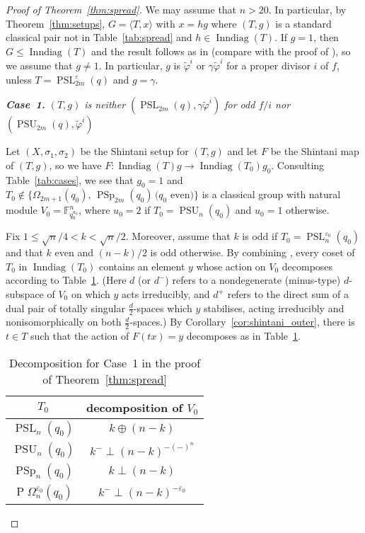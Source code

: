 \documentclass[11pt]{article}
\numberwithin{equation}{section}
\theoremstyle{shdefinition}
\theoremstyle{shplain}
\newcommand{\g}{\gamma}
\newcommand{\e}{\varepsilon}
\renewcommand{\wp}{\widetilde{\varphi}}
\newcommand{\s}{\sigma}
\newcommand{\<}{\langle}
\renewcommand{\>}{\rangle}
\renewcommand{\leq}{\leqslant}
\newcommand{\Inndiag}{\operatorname{Inndiag}}
\newcommand{\F}{\mathbb{F}}
\renewcommand{\:}{\colon}
\newcommand{\PSL}{\operatorname{PSL}}
\newcommand{\PSp}{\operatorname{PSp}}
\newcommand{\PSU}{\operatorname{PSU}}
\newcommand{\Om}{\Omega}
\newcommand{\POm}{\operatorname{P}\!\Om}
\begin{document}
\begin{proof}[Proof of Theorem~\ref{thm:spread}]
We may assume that $n > 20$. In particular, by Theorem~\ref{thm:setups}, $G = \<T,x\>$ with $x = hg$ where $(T,g)$ is a standard classical pair not in Table~\ref{tab:spread} and $h \in \Inndiag(T)$. If $g=1$, then $G \leq \Inndiag(T)$ and the result follows as in \cite[Proposition~4.1]{ref:GuralnickKantor00} (compare with the proof of \cite[Theorem~3.1]{ref:BurnessGuest13}), so we assume that $g \neq 1$. In particular, $g$ is $\wp^i$ or $\g\wp^i$ for a proper divisor $i$ of $f$, unless $T = \PSL^\e_{2m}(q)$ and $g=\g$. \vspace{0.5\baselineskip}

\emph{\textbf{Case~1.} $(T,g)$ is neither $(\PSL_{2m}(q),\g\wp^i)$ for odd $f/i$ nor $(\PSU_{2m}(q),\wp^i)$}\nopagebreak

Let $(X,\s_1,\s_2)$ be the Shintani setup for $(T,g)$ and let $F$ be the Shintani map of $(T,g)$, so we have $F\:\Inndiag(T)g \to \Inndiag(T_0)g_0$. Consulting Table~\ref{tab:cases}, we see that $g_0 = 1$ and $T_0 \not\in \{ \Omega_{2m+1}(q_0), \, \PSp_{2m}(q_0) \, \text{($q_0$ even)} \}$ is a classical group with natural module $V_0 = \F_{q_0^{u_0}}^n$, where $u_0=2$ if $T_0 = \PSU_n(q_0)$ and $u_0=1$ otherwise. 

Fix $1 \leq \sqrt{n}/4 < k < \sqrt{n}/2$. Moreover, assume that $k$ is odd if $T_0 = \PSL^{\e_0}_n(q_0)$ and that $k$ even and $(n-k)/2$ is odd otherwise. By combining \cite[Lemmas~5.3.2--5.36, 6.3.2 and~6.3.4]{ref:Harper}, every coset of $T_0$ in $\Inndiag(T_0)$ contains an element $y$ whose action on $V_0$ decomposes according to Table~\ref{tab:decomposition}. (Here $d$ (or $d^-$) refers to a nondegenerate (minus-type) $d$-subspace of $V_0$ on which $y$ acts irreducibly, and $d^+$ refers to the direct sum of a dual pair of totally singular $\frac{d}{2}$-spaces which $y$ stabilises, acting irreducibly and nonisomorphically on both $\frac{d}{2}$-spaces.) By Corollary~\ref{cor:shintani_outer}, there is $t \in T$ such that the action of $F(tx) = y$ decomposes as in Table~\ref{tab:decomposition}.

\begin{table}
\caption{Decomposition for Case~1 in the proof of Theorem~\ref{thm:spread}} \label{tab:decomposition}
\centering
\begin{tabular}{cc}
\hline
$T_0$                & decomposition of $V_0$      \\
\hline  
$\PSL_n(q_0)$        & $k   \oplus (n-k)$          \\  
$\PSU_n(q_0)$        & $k^- \perp (n-k)^{-(-)^n}$  \\
$\PSp_n(q_0)$        & $k   \perp (n-k)$           \\   
$\POm^{\e_0}_n(q_0)$ & $k^- \perp (n-k)^{-\e_0}$   \\       
\hline
\end{tabular}
\end{table}


\end{proof}
\end{document}
